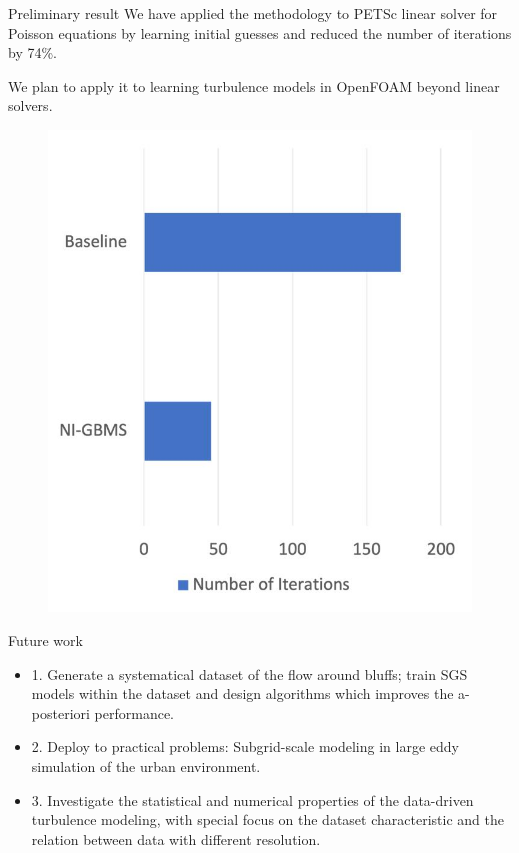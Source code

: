\documentclass[paper slide]{beamer}
\begin{document}
\begin{frame}{Preliminary result}
    We have applied the methodology to PETSc linear solver for Poisson equations by learning initial guesses
    and reduced the number of iterations by 74\%.
 
    We plan to apply it to learning turbulence models in OpenFOAM beyond linear solvers.
 
    \begin{figure}
        \includegraphics[width=0.4\linewidth]{fig/poisson_eq.jpg}
    \end{figure}    
    
\end{frame}
 

\begin{frame}{Future work}
	\begin{itemize}
		\item 1. Generate a systematical dataset of the flow around bluffs; train SGS models within the dataset and design algorithms
		which improves the a-posteriori performance.
		\item 2. Deploy to practical problems: Subgrid-scale modeling in large eddy simulation of the
		urban environment.
		\item 3. Investigate the statistical and numerical properties of the data-driven turbulence modeling, with
		special focus on the dataset characteristic and the relation between data with different resolution.
	\end{itemize}
\end{frame}
\end{document}
